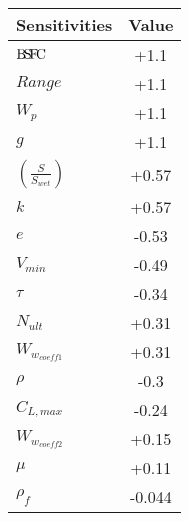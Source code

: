 % 

{\footnotesize
\begin{longtable}{lc}
\toprule
Sensitivities & Value \\ \midrule
${\rm B\!S\!F\!C}$ & +1.1\\
$Range$ & +1.1\\
$W_p$ & +1.1\\
$g$ & +1.1 \\
$\left(\frac{S}{S_{wet}}\right)$ & +0.57 \\
$k$ & +0.57 \\
$e$ & -0.53 \\
$V_{min}$ & -0.49 \\
$\tau$ & -0.34\\
$N_{ult}$ & +0.31 \\
$W_{w_{coeff1}}$ & +0.31\\
$\rho$ & -0.3 \\
$C_{L,max}$ & -0.24\\
$W_{w_{coeff2}}$ & +0.15 \\
$\mu$ & +0.11 \\
$\rho_f$ & -0.044 \\
\bottomrule
\end{longtable}}

% 

% 

